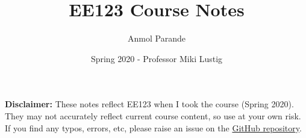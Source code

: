 \documentclass{article}
\begin{document}
\title{EE123 Course Notes}
\author{Anmol Parande}
\date{Spring 2020 - Professor Miki Lustig}
\maketitle
\textbf{Disclaimer: }These notes reflect EE123 when I took the course (Spring 2020). They may not accurately reflect current course content, so use at your own risk.
If you find any typos, errors, etc, please raise an issue on the \href{https://github.com/parandea17/BerkeleyNotes}{GitHub repository}.\\
\tableofcontents
\newpage
\end{document}

